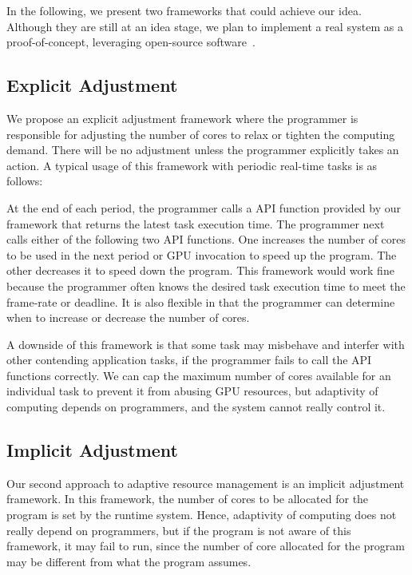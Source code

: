\documentclass[times, 10pt, twocolumn]{article}
\begin{document}
In the following, we present two frameworks that could achieve our idea.
Although they are still at an idea stage, we plan to implement a real
system as a proof-of-concept, leveraging open-source
software~\cite{Kato_OSPERT11}.

\subsection{Explicit Adjustment}

We propose an explicit adjustment framework where the programmer is
responsible for adjusting the number of cores to relax or tighten
the computing demand.
There will be no adjustment unless the programmer explicitly takes an
action.
A typical usage of this framework with periodic real-time tasks is as
follows:

At the end of each period, the programmer calls a API function provided
by our framework that returns the latest task execution time.
The programmer next calls either of the following two API functions.
One increases the number of cores to be used in the next period or GPU
invocation to speed up the program.
The other decreases it to speed down the program.
This framework would work fine because the programmer often knows the
desired task execution time to meet the frame-rate or deadline.
It is also flexible in that the programmer can determine when to
increase or decrease the number of cores.

A downside of this framework is that some task may misbehave
and interfer with other contending application tasks, if the programmer
fails to call the API functions correctly.
We can cap the maximum number of cores available for an individual task
to prevent it from abusing GPU resources, but adaptivity of computing
depends on programmers, and the system cannot really control it.

\subsection{Implicit Adjustment}

Our second approach to adaptive resource management is an implicit
adjustment framework.
In this framework, the number of cores to be allocated for the program
is set by the runtime system.
Hence, adaptivity of computing does not really depend on programmers,
but if the program is not aware of this framework, it may fail to run,
since the number of core allocated for the program may be different from
what the program assumes.
\end{document}
